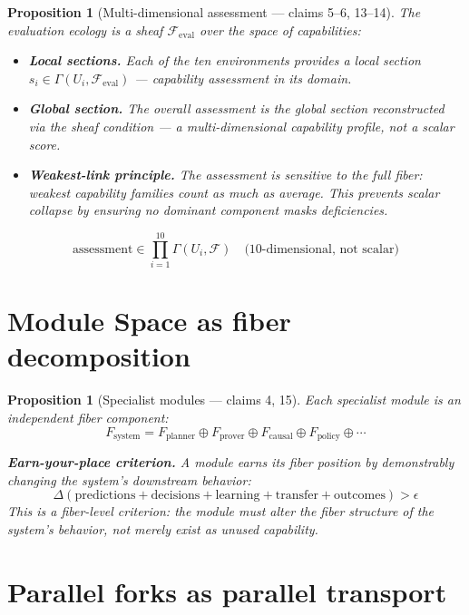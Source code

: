 \documentclass[11pt,a4paper]{article}
\newtheorem{proposition}[definition]{Proposition}
\begin{document}
\begin{proposition}[Multi-dimensional assessment --- claims 5--6, 13--14]
\label{prop:ecology}
The evaluation ecology is a sheaf $\mathcal{F}_{\text{eval}}$ over the
space of capabilities:
\begin{itemize}
  \item \textbf{Local sections.} Each of the ten environments provides a
    local section $s_i \in \Gamma(U_i, \mathcal{F}_{\text{eval}})$ ---
    capability assessment in its domain.
  \item \textbf{Global section.} The overall assessment is the global
    section reconstructed via the sheaf condition --- a multi-dimensional
    capability profile, not a scalar score.
  \item \textbf{Weakest-link principle.} The assessment is sensitive to
    the full fiber: weakest capability families count as much as average.
    This prevents scalar collapse by ensuring no dominant component masks
    deficiencies.
\end{itemize}
\[
  \text{assessment} \in \prod_{i=1}^{10} \Gamma(U_i, \mathcal{F})
  \quad \text{(10-dimensional, not scalar)}
\]
\end{proposition}

\section{Module Space as fiber decomposition}

\begin{proposition}[Specialist modules --- claims 4, 15]
\label{prop:modules}
Each specialist module is an independent fiber component:
\[
  F_{\text{system}} = F_{\text{planner}} \oplus F_{\text{prover}} \oplus
    F_{\text{causal}} \oplus F_{\text{policy}} \oplus \cdots
\]

\textbf{Earn-your-place criterion.} A module earns its fiber position by
demonstrably changing the system's downstream behavior:
\[
  \Delta(\text{predictions} + \text{decisions} + \text{learning} +
    \text{transfer} + \text{outcomes}) > \epsilon
\]
This is a fiber-level criterion: the module must alter the fiber structure
of the system's behavior, not merely exist as unused capability.
\end{proposition}

\section{Parallel forks as parallel transport}
\end{document}
